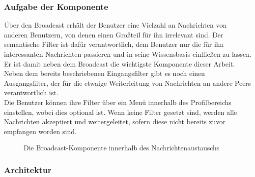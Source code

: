 \subsubsection{Aufgabe der Komponente}
Über den Broadcast erhält der Benutzer eine Vielzahl an Nachrichten von anderen Benutzern, von denen einen Großteil für ihn irrelevant sind. Der semantische Filter ist dafür verantwortlich, dem Benutzer nur die für ihn interessanten Nachrichten passieren und in seine Wissensbasis einfließen zu lassen. Er ist damit neben dem Broadcast die wichtigste Komponente dieser Arbeit. Neben dem bereits beschriebenen Eingangsfilter gibt es noch einen Ausgangsfilter, der für die etwaige Weiterleitung von Nachrichten an andere Peers verantwortlich ist. 
\\Die Benutzer können ihre Filter über ein Menü innerhalb des Profilbereichs einstellen, wobei dies optional ist. Wenn keine Filter gesetzt sind, werden alle Nachrichten akzeptiert und weitergeleitet, sofern diese nicht bereits zuvor empfangen worden sind. \newline
\begin{figure}[H]
	\centering
	\caption{Die Broadcast-Komponente innerhalb des Nachrichtenaustauschs}
	\label{fig:filterComp}
\end{figure}
\newpage
\subsubsection{Architektur}

